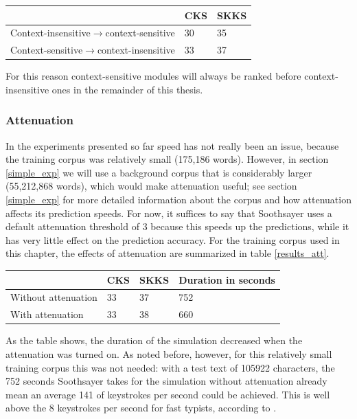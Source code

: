 \documentclass[12pt]{article}
\let\originaltable\table
\let\endoriginaltable\endtable
\renewenvironment{table}[1][ht]{%
  \originaltable[#1]
  \centering}%
  {\endoriginaltable}
\begin{document}
\begin{table}[h]
\begin{tabular}{l|ll} 
&CKS&SKKS\\
\hline
Context-insensitive$\rightarrow$context-sensitive&30&35\\
Context-sensitive$\rightarrow$context-insensitive&33&37\\
\end{tabular} 
\caption{Percentage of keystrokes Soothsayer saves with a context-sensitive module first and a context-insensitive module first} \label{results_concat}
\end{table}

For this reason context-sensitive modules will always be ranked before context-insensitive ones in the remainder of this thesis.

\subsubsection{Attenuation}


In the experiments presented so far speed has not really been an issue, because the training corpus was relatively small (175,186 words). However, in section \ref{simple_exp} we will use a background corpus that is considerably larger (55,212,868 words), which would make attenuation useful; see section \ref{simple_exp} for more detailed information about the corpus and how attenuation affects its prediction speeds. For now, it suffices to say that Soothsayer uses a default attenuation threshold of 3 because this speeds up the predictions, while it has very little effect on the prediction accuracy. For the training corpus used in this chapter, the effects of attenuation are summarized in table \ref{results_att}.

\begin{table}[h]
\begin{tabular}{l|lll} 

&CKS&SKKS&Duration in seconds\\
\hline
Without attenuation&33&37&752\\
With attenuation&33&38&660\\
\end{tabular} 
\caption{Percentage of keystrokes saved and simulation times with and without attenuation.} \label{results_att}
\end{table}

As the table shows, the duration of the simulation decreased when the attenuation was turned on. As noted before, however, for this relatively small training corpus this was not needed: with a test text of 105922 characters, the 752 seconds Soothsayer takes for the simulation without attenuation already mean an average 141 of keystrokes per second could be achieved. This is well above the 8 keystrokes per second for fast typists, according to .
\end{document}
